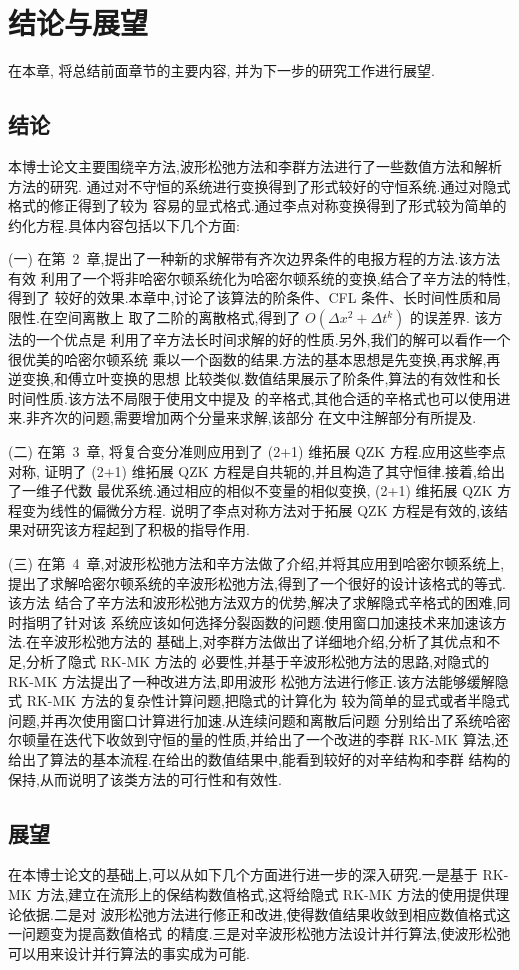 \chapter{结论与展望}
在本章, 将总结前面章节的主要内容, 并为下一步的研究工作进行展望.
\section{结论}
本博士论文主要围绕辛方法,波形松弛方法和李群方法进行了一些数值方法和解析方法的研究.
通过对不守恒的系统进行变换得到了形式较好的守恒系统.通过对隐式格式的修正得到了较为
容易的显式格式.通过李点对称变换得到了形式较为简单的约化方程.具体内容包括以下几个方面:

(一) 在第~2~章,提出了一种新的求解带有齐次边界条件的电报方程的方法.该方法有效
利用了一个将非哈密尔顿系统化为哈密尔顿系统的变换,结合了辛方法的特性,得到了
较好的效果.本章中,讨论了该算法的阶条件、CFL 条件、长时间性质和局限性.在空间离散上
取了二阶的离散格式,得到了 $O(\Delta x^2+ \Delta t^k)$ 的误差界. 该方法的一个优点是
利用了辛方法长时间求解的好的性质.另外,我们的解可以看作一个很优美的哈密尔顿系统
乘以一个函数的结果.方法的基本思想是先变换,再求解,再逆变换,和傅立叶变换的思想
比较类似.数值结果展示了阶条件,算法的有效性和长时间性质.该方法不局限于使用文中提及
的辛格式,其他合适的辛格式也可以使用进来.非齐次的问题,需要增加两个分量来求解,该部分
在文中注解部分有所提及.

(二) 在第~3~章, 将复合变分准则应用到了 (2+1) 维拓展 QZK 方程.应用这些李点对称,
证明了 (2+1) 维拓展 QZK 方程是自共轭的,并且构造了其守恒律.接着,给出了一维子代数
最优系统.通过相应的相似不变量的相似变换, (2+1) 维拓展 QZK 方程变为线性的偏微分方程.
说明了李点对称方法对于拓展 QZK 方程是有效的,该结果对研究该方程起到了积极的指导作用.

(三) 在第~4~章,对波形松弛方法和辛方法做了介绍,并将其应用到哈密尔顿系统上,
提出了求解哈密尔顿系统的辛波形松弛方法,得到了一个很好的设计该格式的等式.该方法
结合了辛方法和波形松弛方法双方的优势,解决了求解隐式辛格式的困难,同时指明了针对该
系统应该如何选择分裂函数的问题.使用窗口加速技术来加速该方法.在辛波形松弛方法的
基础上,对李群方法做出了详细地介绍,分析了其优点和不足,分析了隐式 RK-MK 方法的
必要性,并基于辛波形松弛方法的思路,对隐式的 RK-MK 方法提出了一种改进方法,即用波形
松弛方法进行修正.该方法能够缓解隐式 RK-MK 方法的复杂性计算问题,把隐式的计算化为
较为简单的显式或者半隐式问题,并再次使用窗口计算进行加速.从连续问题和离散后问题
分别给出了系统哈密尔顿量在迭代下收敛到守恒的量的性质,并给出了一个改进的李群 RK-MK
算法,还给出了算法的基本流程.在给出的数值结果中,能看到较好的对辛结构和李群
结构的保持,从而说明了该类方法的可行性和有效性.

\section{展望}
在本博士论文的基础上,可以从如下几个方面进行进一步的深入研究.一是基于 RK-MK
方法,建立在流形上的保结构数值格式,这将给隐式 RK-MK 方法的使用提供理论依据.二是对
波形松弛方法进行修正和改进,使得数值结果收敛到相应数值格式这一问题变为提高数值格式
的精度.三是对辛波形松弛方法设计并行算法,使波形松弛可以用来设计并行算法的事实成为可能.
